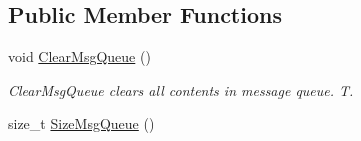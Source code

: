 \subsection*{Public Member Functions}
\begin{DoxyCompactItemize}
\item 
\hypertarget{class_r_c_s_1_1_c_message_queue_a1fbabdd6e6aaf02572a93531ed871559}{}void \hyperlink{class_r_c_s_1_1_c_message_queue_a1fbabdd6e6aaf02572a93531ed871559}{Clear\+Msg\+Queue} ()\label{class_r_c_s_1_1_c_message_queue_a1fbabdd6e6aaf02572a93531ed871559}

\begin{DoxyCompactList}\small\item\em Clear\+Msg\+Queue clears all contents in message queue. T. \end{DoxyCompactList}\item 
\hypertarget{class_r_c_s_1_1_c_message_queue_a7929c4ce871eab3dfb8dfabd5bf4bdb9}{}size\+\_\+t \hyperlink{class_r_c_s_1_1_c_message_queue_a7929c4ce871eab3dfb8dfabd5bf4bdb9}{Size\+Msg\+Queue} ()\label{class_r_c_s_1_1_c_message_queue_a7929c4ce871eab3dfb8dfabd5bf4bdb9}


\end{DoxyCompactItemize}
